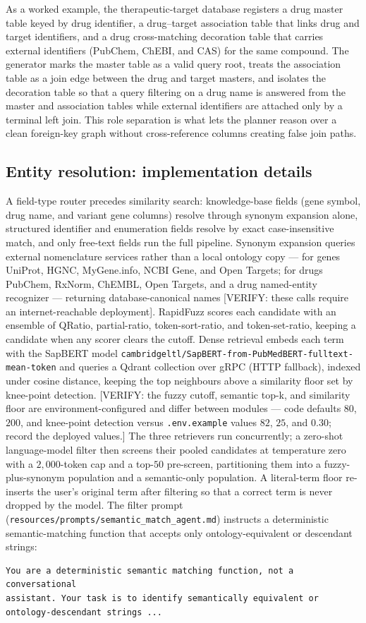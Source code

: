 As a worked example, the therapeutic-target database registers a drug master table keyed by drug identifier, a drug--target association table that links drug and target identifiers, and a drug cross-matching decoration table that carries external identifiers (PubChem, ChEBI, and CAS) for the same compound. The generator marks the master table as a valid query root, treats the association table as a join edge between the drug and target masters, and isolates the decoration table so that a query filtering on a drug name is answered from the master and association tables while external identifiers are attached only by a terminal left join. This role separation is what lets the planner reason over a clean foreign-key graph without cross-reference columns creating false join paths.

\subsection*{Entity resolution: implementation details}

A field-type router precedes similarity search: knowledge-base fields (gene symbol, drug name, and variant gene columns) resolve through synonym expansion alone, structured identifier and enumeration fields resolve by exact case-insensitive match, and only free-text fields run the full pipeline. Synonym expansion queries external nomenclature services rather than a local ontology copy — for genes UniProt, HGNC, MyGene.info, NCBI Gene, and Open Targets; for drugs PubChem, RxNorm, ChEMBL, Open Targets, and a drug named-entity recognizer — returning database-canonical names [VERIFY: these calls require an internet-reachable deployment]. RapidFuzz scores each candidate with an ensemble of QRatio, partial-ratio, token-sort-ratio, and token-set-ratio, keeping a candidate when any scorer clears the cutoff. Dense retrieval embeds each term with the SapBERT model \texttt{cambridgeltl/SapBERT-from-PubMedBERT-fulltext-mean-token} and queries a Qdrant collection over gRPC (HTTP fallback), indexed under cosine distance, keeping the top neighbours above a similarity floor set by knee-point detection. [VERIFY: the fuzzy cutoff, semantic top-k, and similarity floor are environment-configured and differ between modules — code defaults $80$, $200$, and knee-point detection versus \texttt{.env.example} values $82$, $25$, and $0.30$; record the deployed values.] The three retrievers run concurrently; a zero-shot language-model filter then screens their pooled candidates at temperature zero with a $2{,}000$-token cap and a top-$50$ pre-screen, partitioning them into a fuzzy-plus-synonym population and a semantic-only population. A literal-term floor re-inserts the user's original term after filtering so that a correct term is never dropped by the model. The filter prompt (\texttt{resources/prompts/semantic\_match\_agent.md}) instructs a deterministic semantic-matching function that accepts only ontology-equivalent or descendant strings:
\begin{verbatim}
You are a deterministic semantic matching function, not a conversational
assistant. Your task is to identify semantically equivalent or
ontology-descendant strings ...
\end{verbatim}


